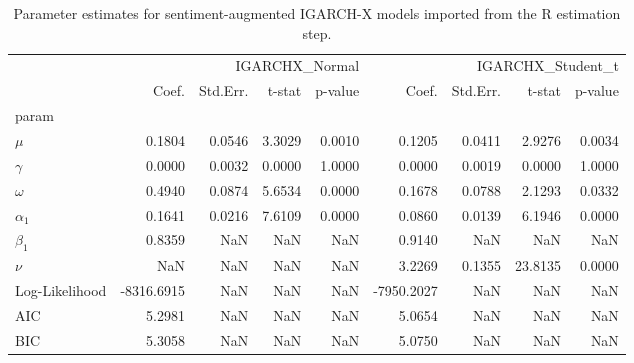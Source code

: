 \begin{table}
\caption{Parameter estimates for sentiment-augmented IGARCH-X models imported from the R estimation step.}
\label{tab:igarchx_params}
\begin{tabular}{lrrrrrrrr}
\toprule
 & \multicolumn{4}{r}{IGARCHX_Normal} & \multicolumn{4}{r}{IGARCHX_Student_t} \\
 & Coef. & Std.Err. & t-stat & p-value & Coef. & Std.Err. & t-stat & p-value \\
param &  &  &  &  &  &  &  &  \\
\midrule
$\mu$ & 0.1804 & 0.0546 & 3.3029 & 0.0010 & 0.1205 & 0.0411 & 2.9276 & 0.0034 \\
$\gamma$ & 0.0000 & 0.0032 & 0.0000 & 1.0000 & 0.0000 & 0.0019 & 0.0000 & 1.0000 \\
$\omega$ & 0.4940 & 0.0874 & 5.6534 & 0.0000 & 0.1678 & 0.0788 & 2.1293 & 0.0332 \\
$\alpha_1$ & 0.1641 & 0.0216 & 7.6109 & 0.0000 & 0.0860 & 0.0139 & 6.1946 & 0.0000 \\
$\beta_1$ & 0.8359 & NaN & NaN & NaN & 0.9140 & NaN & NaN & NaN \\
$\nu$ & NaN & NaN & NaN & NaN & 3.2269 & 0.1355 & 23.8135 & 0.0000 \\
Log-Likelihood & -8316.6915 & NaN & NaN & NaN & -7950.2027 & NaN & NaN & NaN \\
AIC & 5.2981 & NaN & NaN & NaN & 5.0654 & NaN & NaN & NaN \\
BIC & 5.3058 & NaN & NaN & NaN & 5.0750 & NaN & NaN & NaN \\
\bottomrule
\end{tabular}
\end{table}
